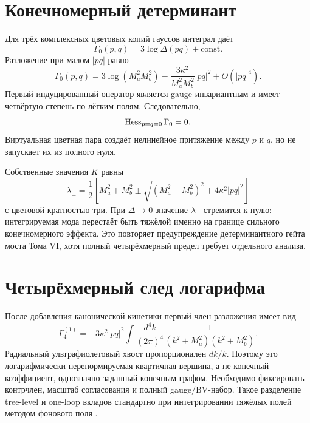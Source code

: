 \section{Конечномерный детерминант}

Для трёх комплексных цветовых копий гауссов интеграл даёт
\begin{equation}
 \Gamma_{0}(p,q)
 =3\log\Delta(pq)+\mathrm{const}.
 \label{eq:v7-virtual-bridge-zero-mode-logdet}
\end{equation}
Разложение при малом $|pq|$ равно
\begin{equation}
 \Gamma_{0}(p,q)
 =3\log(M_a^2M_b^2)
 -\frac{3\kappa^2}{M_a^2M_b^2}|pq|^2
 +O(|pq|^4).
 \label{eq:v7-virtual-bridge-quartic-expansion}
\end{equation}
Первый индуцированный оператор является gauge-инвариантным и имеет
четвёртую степень по лёгким полям. Следовательно,
\begin{equation}
 \operatorname{Hess}_{p=q=0}\Gamma_0=0.
 \label{eq:v7-virtual-bridge-zero-light-hessian}
\end{equation}
Виртуальная цветная пара создаёт нелинейное притяжение между $p$ и $q$,
но не запускает их из полного нуля.

Собственные значения $K$ равны
\begin{equation}
 \lambda_{\pm}
 =\frac12\left[M_a^2+M_b^2
 \pm\sqrt{(M_a^2-M_b^2)^2+4\kappa^2|pq|^2}\right]
 \label{eq:v7-virtual-bridge-heavy-eigenvalues}
\end{equation}
с цветовой кратностью три. При $\Delta\to0$ значение $\lambda_-$ стремится
к нулю: интегрируемая мода перестаёт быть тяжёлой именно на границе
сильного конечномерного эффекта. Это повторяет предупреждение детерминантного
гейта моста Тома VI, хотя полный четырёхмерный предел требует отдельного
анализа.

\section{Четырёхмерный след логарифма}

После добавления канонической кинетики первый член разложения имеет вид
\begin{equation}
 \Gamma_{4}^{(1)}
 =-3\kappa^2|pq|^2
 \int\frac{d^4k}{(2\pi)^4}
 \frac{1}{(k^2+M_a^2)(k^2+M_b^2)}.
 \label{eq:v7-virtual-bridge-four-dimensional-term}
\end{equation}
Радиальный ультрафиолетовый хвост пропорционален $dk/k$. Поэтому это
логарифмически перенормируемая квартичная вершина, а не конечный
коэффициент, однозначно заданный конечным графом. Необходимо фиксировать
контрчлен, масштаб согласования и полный gauge/BV-набор. Такое разделение
tree-level и one-loop вкладов стандартно при интегрировании тяжёлых полей
методом фонового поля
\cite{v7-virtual-bridge-hlm,v7-virtual-bridge-dittmaier}.

